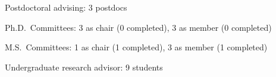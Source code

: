 \begin{veryTightItemize}
    \item Postdoctoral advising: 3 postdocs
    \item Ph.D.\ Committees: 3 as chair (0 completed), 3 as member (0 completed)
    \item M.S.\ Committees:  1 as chair (1 completed), 3 as member (1 completed)
    \item Undergraduate research advisor: 9 students
\end{veryTightItemize}
